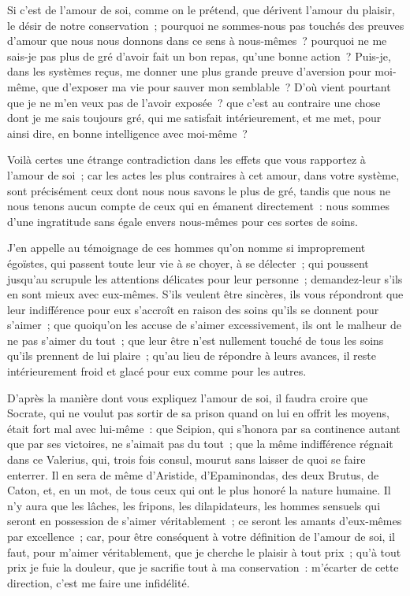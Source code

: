 \documentclass[french,twoside]{book} %
\newcommand\chaptercont{} %
\begin{document}
\chaptercont
\noindent Si c’est de l’amour de soi, comme on le prétend, que dérivent l’amour du plaisir, le désir de notre conservation ; pourquoi ne sommes-nous pas touchés des preuves d’amour que nous nous donnons dans ce sens à nous-mêmes ? pourquoi ne me sais-je pas plus de gré d’avoir fait un bon repas, qu’une bonne action ? Puis-je, dans les systèmes reçus, me donner une plus grande preuve d’aversion pour moi-même, que d’exposer ma vie pour sauver mon semblable ? D’où vient pourtant que je ne m’en veux pas de l’avoir exposée ? que c’est au contraire une chose dont je me sais toujours gré, qui me satisfait intérieurement, et me met, pour ainsi dire, en bonne intelligence avec moi-même ?\par
Voilà certes une étrange contradiction dans les effets que vous rapportez à l’amour de soi ; car les actes les plus contraires à cet amour, dans votre système, sont précisément ceux dont nous nous savons le plus de gré, tandis que nous ne nous tenons aucun compte de ceux qui en émanent directement : nous sommes d’une ingratitude sans égale envers nous-mêmes pour ces sortes de soins.\par
J’en appelle au témoignage de ces hommes qu’on nomme si improprement égoïstes, qui passent toute leur vie à se choyer, à se délecter ; qui poussent jusqu’au scrupule les attentions délicates pour leur personne ; demandez-leur s’ils en sont mieux avec eux-mêmes. S’ils veulent être sincères, ils vous répondront que leur indifférence pour eux s’accroît en raison des soins qu’ils se donnent pour s’aimer ; que quoiqu’on les accuse de s’aimer excessivement, ils ont le malheur de ne pas s’aimer du tout ; que leur être n’est nullement touché de tous les soins qu’ils prennent de lui plaire ; qu’au lieu de répondre à leurs avances, il reste intérieurement froid et glacé pour eux comme pour les autres.\par
D’après la manière dont vous expliquez l’amour de soi, il faudra croire que Socrate, qui ne voulut pas sortir de sa prison quand on lui en offrit les moyens, était fort mal avec lui-même : que Scipion, qui s’honora par sa continence autant que par ses victoires, ne s’aimait pas du tout ; que la même indifférence régnait dans ce Valerius, qui, trois fois consul, mourut sans laisser de quoi se faire enterrer. Il en sera de même d’Aristide, d’Epaminondas, des deux Brutus, de Caton, et, en un mot, de tous ceux qui ont le plus honoré la nature humaine. Il n’y aura que les lâches, les fripons, les dilapidateurs, les hommes sensuels qui seront en possession de s’aimer véritablement ; ce seront les amants d’eux-mêmes par excellence ; car, pour être conséquent à votre définition de l’amour de soi, il faut, pour m’aimer véritablement, que je cherche le plaisir à tout prix ; qu’à tout prix je fuie la douleur, que je sacrifie tout à ma conservation : m’écarter de cette direction, c’est me faire une infidélité.\par
\end{document}
